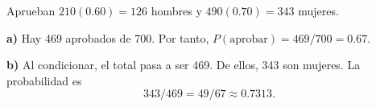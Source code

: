 Aprueban $210(0.60)=126$ hombres y $490(0.70)=343$ mujeres.

\textbf{a)} Hay 469 aprobados de 700. Por tanto,
$P(\text{aprobar})=469/700=\boxed{0.67}$.

\textbf{b)} Al condicionar, el total pasa a ser 469.
De ellos, 343 son mujeres. La probabilidad es
\[\boxed{343/469=49/67\approx0.7313}.\]
